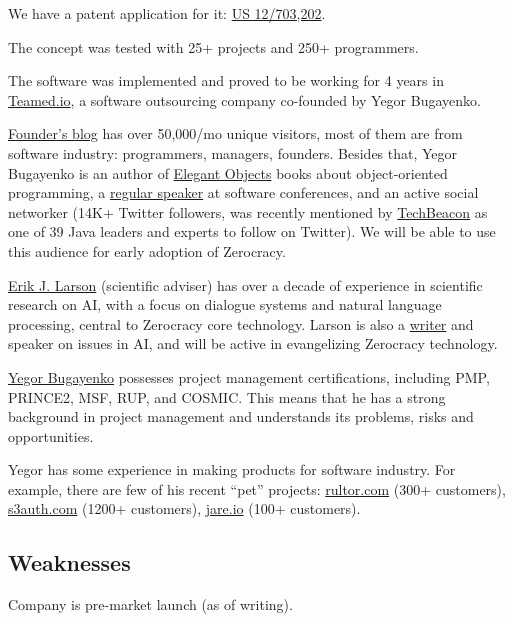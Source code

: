 \documentclass[12pt]{article}
\begin{document}
We have a patent application for it:
\href{https://patents.google.com/patent/US20110196798}{US 12/703,202}.

The concept was tested with 25+ projects and 250+ programmers.

The software was implemented and proved to be working for 4 years in
\href{http://www.teamed.io}{Teamed.io},
a software outsourcing company co-founded by Yegor Bugayenko.

\href{http://www.yegor256.com}{Founder's blog} has over 50,000/mo unique visitors, most of them are from
software industry: programmers, managers, founders. Besides that, Yegor
Bugayenko is an author of \href{https://amzn.to/2bYXQy7}{Elegant Objects} books about object-oriented
programming, a \href{https://lanyrd.com/profile/yegor256/}{regular speaker} at software conferences, and an active social
networker (14K+ Twitter followers, was recently mentioned by \href{https://techbeacon.com/java-leaders-you-should-follow-twitter}{TechBeacon} as one
of 39 Java leaders and experts to follow on Twitter). We will be able to use
this audience for early adoption of Zerocracy.

\href{https://www.linkedin.com/in/erik-larson-b287ba9}{Erik J. Larson} (scientific adviser) has over a decade of experience in
scientific research on AI, with a focus on dialogue systems and natural language
processing, central to Zerocracy core technology. Larson is also a
\href{https://www.theatlantic.com/technology/archive/2015/05/the-humanists-paradox/391622/}{writer} and
speaker on issues in AI, and will be active in evangelizing Zerocracy
technology.

\href{http://www.yegor256.com/about-me.html}{Yegor Bugayenko} possesses project management certifications, including PMP,
PRINCE2, MSF, RUP, and COSMIC. This means that he has a strong background in
project management and understands its problems, risks and opportunities.

Yegor has some experience in making products for software industry. For example,
there are few of his recent ``pet'' projects:
\href{http://www.rultor.com}{rultor.com} (300+ customers),
\href{http://www.s3auth.com}{s3auth.com} (1200+ customers),
\href{http://www.jare.io}{jare.io} (100+ customers).

\subsection{Weaknesses}

Company is pre-market launch (as of writing).
\end{document}

